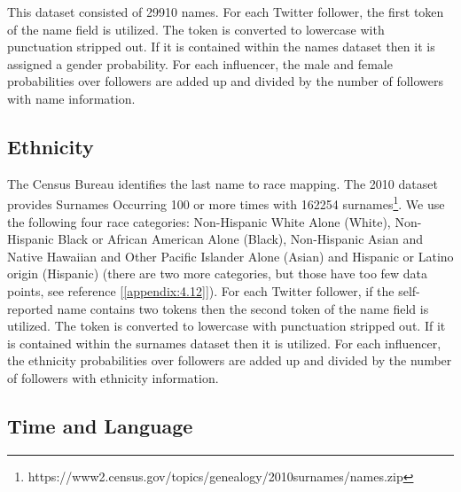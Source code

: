 This dataset consisted of 29910 names. For each Twitter follower, the first token of the name field is utilized. The token is converted to lowercase with punctuation stripped out. If it is contained within the names dataset then it is assigned a gender probability. For each influencer, the male and female probabilities over followers are added up and divided by the number of followers with name information.

\subsection{Ethnicity}
The Census Bureau identifies the last name to race mapping. The 2010 dataset provides Surnames Occurring 100 or more times with 162254 surnames\footnote{https://www2.census.gov/topics/genealogy/2010surnames/names.zip}. We use the following four race categories: Non-Hispanic White Alone (White), Non-Hispanic Black or African American Alone (Black), Non-Hispanic Asian and Native Hawaiian and Other Pacific Islander Alone (Asian) and Hispanic or Latino origin (Hispanic) (there are two more categories, but those have too few data points, see reference [\ref{appendix:4.12}]).
For each Twitter follower, if the self-reported name contains two tokens then the second token of the name field is utilized. The token is converted to lowercase with punctuation stripped out. If it is contained within the surnames dataset then it is utilized. For each influencer, the ethnicity probabilities over followers are added up and divided by the number of followers with ethnicity information. 

\subsection{Time and Language}

